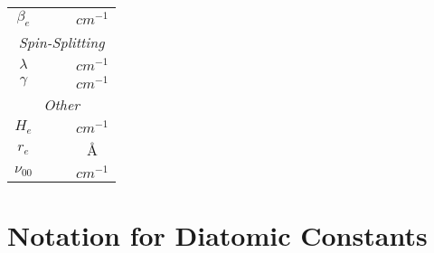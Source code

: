 \documentclass[11pt, twoside, fleqn]{report}
\begin{document}
\begin{table}[H]
\begin{tabular}{cccc}
        $\beta_e$     &                           &                         & $\unit{cm^{-1}}$ \\
        \multicolumn{4}{c}{\textit{Spin-Splitting}}                                            \\
        \cmidrule(lr){1-4}
        $\lambda$     &                           &                         & $\unit{cm^{-1}}$ \\
        $\gamma$      &                           &                         & $\unit{cm^{-1}}$ \\
        \multicolumn{4}{c}{\textit{Other}}                                                     \\
        \cmidrule(lr){1-4}
        $H_e$         &                           &                         & $\unit{cm^{-1}}$ \\
        $r_e$         &                           &                         & \AA              \\
        $\nu_{00}$    &                           &                         & $\unit{cm^{-1}}$ \\
        \bottomrule
    \end{tabular}
\end{table}

\chapter{Notation for Diatomic Constants}
\label{a:notation_for_diatomic_constants}
\end{document}
